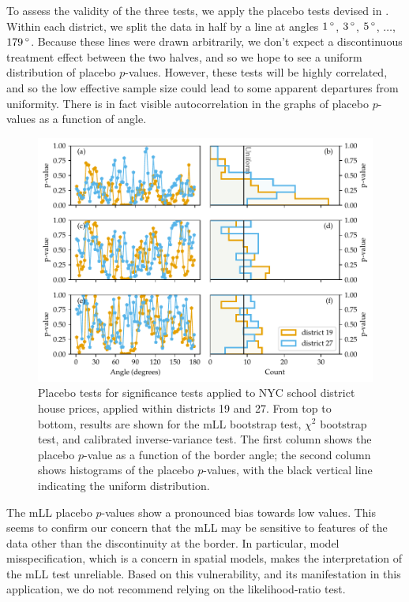 To assess the validity of the three tests, we apply the placebo tests devised in .
Within each district, we split the data in half by a line at angles \(1\,^\circ\), \(3\,^\circ\), \(5\,^\circ\), \(\dotsc\), \(179\,^\circ\).
Because these lines were drawn arbitrarily, we don't expect a discontinuous treatment effect between the two halves, and so we hope to see a uniform distribution of placebo \(p\)-values.
However, these tests will be highly correlated,
and so the low effective sample size could lead to some apparent departures from uniformity.
There is in fact visible autocorrelation in the graphs of placebo \(p\)-values as a function of angle.

\begin{figure}[tbp]
    \centering
    \includegraphics[width=\textwidth]{figures/NYC_placebos.pdf}
    \caption{
        \label{fig:nyc_placebos}
        Placebo tests for significance tests applied to NYC school district house prices, applied within districts 19 and 27. From top to bottom, results are shown for the mLL bootstrap test, \(\chi^2\) bootstrap test, and calibrated inverse-variance test. The first column shows the placebo \(p\)-value as a function of the border angle; the second column shows histograms of the placebo \(p\)-values, with the black vertical line indicating the uniform distribution.
    }
\end{figure}

    The mLL placebo \(p\)-values show a pronounced bias towards low values.
This seems to confirm our concern that the mLL may be sensitive to features of the data other than the discontinuity at the border.
In particular, model misspecification, which is a concern in spatial models, makes the interpretation of the mLL test unreliable.
Based on this vulnerability, and its manifestation in this application, we do not recommend relying on the likelihood-ratio test.

